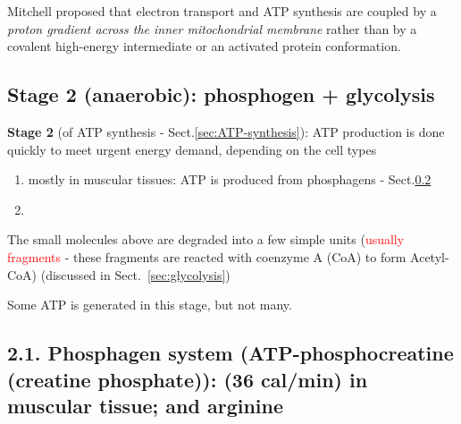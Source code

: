 Mitchell proposed that electron transport and ATP synthesis are coupled by a
{\it proton gradient across the inner mitochondrial membrane} rather than by a
covalent high-energy intermediate or an activated protein conformation.



\subsection{Stage 2 (anaerobic): phosphogen + glycolysis}
\label{sec:stage-2}


{\bf Stage 2}  (of ATP synthesis - Sect.\ref{sec:ATP-synthesis}): ATP production
is done quickly to meet urgent energy demand, depending on the cell types
\begin{enumerate}
  \item mostly in muscular tissues: ATP is produced from phosphagens -
  Sect.\ref{sec:ATP-PC}

  \item
\end{enumerate}

The small molecules above are degraded into a few simple units
(\textcolor{red}{usually  fragments} - these fragments are
reacted with coenzyme A (CoA) to form Acetyl-CoA) (discussed in
Sect.~\ref{sec:glycolysis})

Some ATP is generated in this stage, but not many.

\subsection{2.1. Phosphagen system (ATP-phosphocreatine (creatine phosphate)):
(36 cal/min)  in muscular tissue; and arginine }
\label{sec:ATP-PC}
\label{sec:phosphagen-system}
\label{sec:phosphocreatine}
\label{sec:creatine-phosphate}
\label{sec:ATP-production-in-cytosol-via-phosphagen-system}

